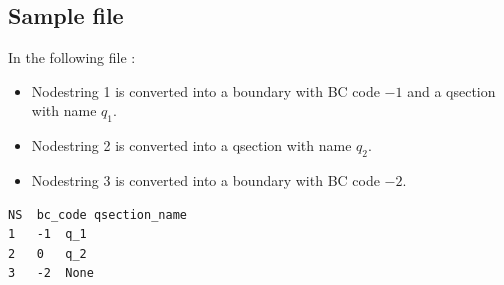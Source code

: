 \subsection{Sample file}

In the following file : \begin{itemize}
    \item Nodestring 1 is converted into a boundary with BC code $-1$ and a qsection with name $q_1$.
    \item Nodestring 2 is converted into a qsection with name $q_2$.
    \item Nodestring 3 is converted into a boundary with BC code $-2$.
\end{itemize}

\begin{verbatim}
NS	bc_code	qsection_name
1	-1	q_1
2	0	q_2
3	-2	None
\end{verbatim}
